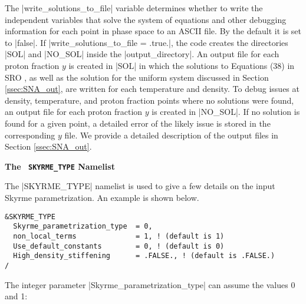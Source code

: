 \documentclass[letterpaper,11pt]{refart}
\begin{document}
  
The
\verbprm|write_solutions_to_file| variable determines whether to write the independent
variables that solve the system of equations and other debugging
information for each point in phase space to an ASCII file. By the
default it is set to
\verbprm|false|. If \verbprm|write_solutions_to_file = .true.|, the
code creates the directories \verbfile|SOL| and \verbfile|NO_SOL|
inside the \verbfile|output_directory|.  An output file for each
proton fraction $y$ is created in
\verbfile|SOL| in which the solutions to Equations (38) in SRO \cite{schneider:17}, as well as the solution for
the uniform system discussed in Section \ref{ssec:SNA_out}, are
written for each temperature and density.  To debug issues at density,
temperature, and proton fraction points where no solutions were found,
an output file for each proton fraction $y$ is created in
\verbfile|NO_SOL|.  If no solution is found for a given point, a
detailed error of the likely issue is stored in the corresponding $y$
file.  We provide a detailed description of the output files in
Section \ref{ssec:SNA_out}.


\bigskip
\textbf{The \texttt{\color{cyan} SKYRME\_TYPE} Namelist}

The \verbnml|SKYRME_TYPE| namelist is used to give a few details on
the input Skyrme parametrization. An example is shown below.

{\color{cyan}
\begin{verbatim}
&SKYRME_TYPE
  Skyrme_parametrization_type  = 0,
  non_local_terms              = 1, ! (default is 1) 
  Use_default_constants        = 0, ! (default is 0) 
  High_density_stiffening      = .FALSE., ! (default is .FALSE.) 
/
\end{verbatim}}




The integer parameter \verbprm|Skyrme_parametrization_type| can assume
the values 0 and 1:
\end{document}
